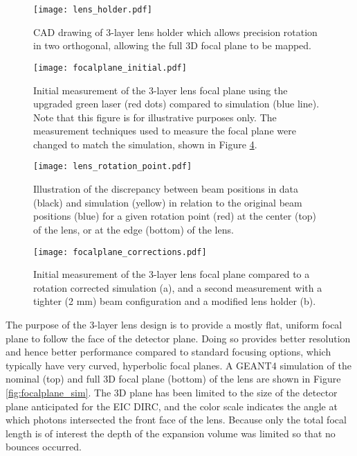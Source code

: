 \begin{figure}[!htb]
	\centering
	\texttt{[image: lens\_holder.pdf]}
	\caption{CAD drawing of 3-layer lens holder which allows precision rotation in two orthogonal, allowing the full 3D focal plane to be mapped.}
	\label{fig:lens_holder}
\end{figure}

\begin{figure}[!htb]
	\centering
	\texttt{[image: focalplane\_initial.pdf]}
	\caption{Initial measurement of the 3-layer lens focal plane using the upgraded green laser (red dots) compared to simulation (blue line). Note that this figure is for illustrative purposes only. The measurement techniques used to measure the focal plane were changed to match the simulation, shown in Figure \ref{fig:focalplane_corrections}.}
	\label{fig:focalplane_initial}
\end{figure}

\begin{figure}[!htb]
	\centering
	\texttt{[image: lens\_rotation\_point.pdf]}
	\caption{Illustration of the discrepancy between beam positions in data (black) and simulation (yellow) in relation to the original beam positions (blue) for a given rotation point (red) at the center (top) of the lens, or at the edge (bottom) of the lens. }
	\label{fig:lens_rotation_point}
\end{figure}

\begin{figure}[!htb]
	\centering
	\texttt{[image: focalplane\_corrections.pdf]}
	\caption{Initial measurement of the 3-layer lens focal plane compared to a rotation corrected simulation (a), and a second measurement with a tighter (2 mm) beam configuration and a modified lens holder (b).}
	\label{fig:focalplane_corrections}
\end{figure}

The purpose of the 3-layer lens design is to provide a mostly flat, uniform focal plane to follow the face of the detector plane. Doing so provides better resolution and hence better performance compared to standard focusing options, which typically have very curved, hyperbolic focal planes. A GEANT4 simulation of the nominal (top) and full 3D focal plane (bottom) of the lens are shown in Figure \ref{fig:focalplane_sim}. The 3D plane has been limited to the size of the detector plane anticipated for the EIC DIRC, and the color scale indicates the angle at which photons intersected the front face of the lens. Because only the total focal length is of interest the depth of the expansion volume was limited so that no bounces occurred.

